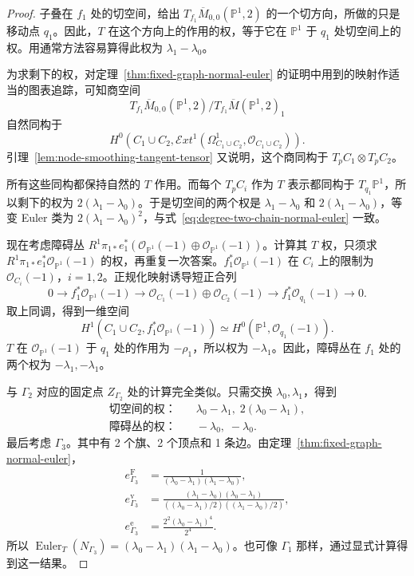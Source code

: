 \begin{proof}
子叠在 $f_1$ 处的切空间，给出 $T_{f_1}\overline M_{0,0}(\mathbb P^1,2)$ 的一个切方向，所做的只是移动点 $q_1$。因此，$T$ 在这个方向上的作用的权，等于它在 $\mathbb P^1$ 于 $q_1$ 处切空间上的权。用通常方法容易算得此权为 $\lambda_1-\lambda_0$。

为求剩下的权，对定理~\ref{thm:fixed-graph-normal-euler} 的证明中用到的映射作适当的图表追踪，可知商空间
\[
T_{f_1}\overline M_{0,0}(\mathbb P^1,2)/T_{f_1}\overline M(\mathbb P^1,2)_1
\]
自然同构于
\[
H^0(C_1\cup C_2,\mathcal E xt^1(\Omega_{C_1\cup C_2}^1,\mathcal O_{C_1\cup C_2})).
\]
引理~\ref{lem:node-smoothing-tangent-tensor} 又说明，这个商同构于 $T_pC_1\otimes T_pC_2$。

所有这些同构都保持自然的 $T$ 作用。而每个 $T_pC_i$ 作为 $T$ 表示都同构于 $T_{q_1}\mathbb P^1$，所以剩下的权为 $2(\lambda_1-\lambda_0)$。于是切空间的两个权是 $\lambda_1-\lambda_0$ 和 $2(\lambda_1-\lambda_0)$，等变 Euler 类为 $2(\lambda_1-\lambda_0)^2$，与式~\eqref{eq:degree-two-chain-normal-euler} 一致。

现在考虑障碍丛 $R^1\pi_{1*}e_1^*(\mathcal O_{\mathbb P^1}(-1)\oplus\mathcal O_{\mathbb P^1}(-1))$。计算其 $T$ 权，只须求 $R^1\pi_{1*}e_1^*\mathcal O_{\mathbb P^1}(-1)$ 的权，再重复一次答案。$f_1^*\mathcal O_{\mathbb P^1}(-1)$ 在 $C_i$ 上的限制为 $\mathcal O_{C_i}(-1)$，$i=1,2$。正规化映射诱导短正合列
\[
0\longrightarrow f_1^*\mathcal O_{\mathbb P^1}(-1)
\longrightarrow\mathcal O_{C_1}(-1)\oplus\mathcal O_{C_2}(-1)
\longrightarrow f_1^*\mathcal O_{q_1}(-1)\longrightarrow0.
\]
取上同调，得到一维空间
\[
H^1(C_1\cup C_2,f_1^*\mathcal O_{\mathbb P^1}(-1))
\simeq H^0(\mathbb P^1,\mathcal O_{q_1}(-1)).
\]
$T$ 在 $\mathcal O_{\mathbb P^1}(-1)$ 于 $q_1$ 处的作用为 $-\rho_1$，所以权为 $-\lambda_1$。因此，障碍丛在 $f_1$ 处的两个权为 $-\lambda_1,-\lambda_1$。

与 $\Gamma_2$ 对应的固定点 $Z_{\Gamma_2}$ 处的计算完全类似。只需交换 $\lambda_0,\lambda_1$，得到
\begin{align*}
\text{切空间的权：}&\quad\lambda_0-\lambda_1,\;2(\lambda_0-\lambda_1),\\
\text{障碍丛的权：}&\quad-\lambda_0,\;-\lambda_0.
\end{align*}
最后考虑 $\Gamma_3$。其中有 2 个旗、2 个顶点和 1 条边。由定理~\ref{thm:fixed-graph-normal-euler}，
\begin{align*}
e_{\Gamma_3}^{\mathrm F}&=\frac1{(\lambda_0-\lambda_1)(\lambda_1-\lambda_0)},\\
e_{\Gamma_3}^{\mathrm v}&=\frac{(\lambda_1-\lambda_0)(\lambda_0-\lambda_1)}
{((\lambda_0-\lambda_1)/2)((\lambda_1-\lambda_0)/2)},\\
e_{\Gamma_3}^{\mathrm e}&=\frac{2^2(\lambda_0-\lambda_1)^4}{2^4}.
\end{align*}
所以 $\operatorname{Euler}_T(N_{\Gamma_3})=(\lambda_0-\lambda_1)(\lambda_1-\lambda_0)$。也可像 $\Gamma_1$ 那样，通过显式计算得到这一结果。


\end{proof}
